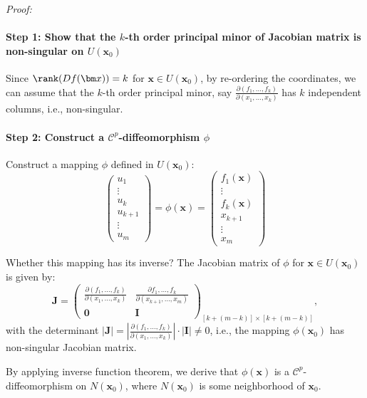\textit{Proof:}
\paragraph{Step 1: Show that the $k$-th order principal minor of Jacobian matrix is non-singular on $U(\bm x_0)$}
Since $\rank(Df(\bm x))=k$ for $\bm x\in U(\bm x_0)$, by re-ordering the coordinates, we can assume that the $k$-th order principal minor, say $\frac{\partial (f_1,\dots,f_k)}{\partial (x_1,\dots,x_k)}$ has $k$ independent columns, i.e., non-singular.

\paragraph{Step 2: Construct a $\mathcal{C}^p$-diffeomorphism $\phi$}
Construct a mapping $\phi$ defined in $U(\bm x_0)$:
\begin{equation}\label{Eq:11:18}
\begin{pmatrix}
u_1\\\vdots\\u_k\\u_{k+1}\\\vdots\\u_m
\end{pmatrix}
=
\phi(\bm x)
=\begin{pmatrix}
f_1(\bm x)\\
\vdots\\
f_k(\bm x)\\
x_{k+1}\\
\vdots\\
x_m
\end{pmatrix}
\end{equation}

Whether this mapping has its inverse? The Jacobian matrix of $\phi$ for $\bm x\in U(\bm x_0)$ is given by:
\[
\bm J=\begin{pmatrix}
\frac{\partial (f_1,\dots,f_k)}{\partial(x_1,\dots,x_k)}&\frac{\partial {f_1,\dots,f_k}}{\partial (x_{k+1},\dots,x_m)}\\
\bm0&\bm I
\end{pmatrix}_{[k+(m-k)]\times [k+(m-k)]},
\]
with the determinant $|\bm J|=|\frac{\partial (f_1,\dots,f_k)}{\partial(x_1,\dots,x_k)}|\cdot|\bm I|\ne0$, i.e., the mapping $\phi(\bm x_0)$ has non-singular Jacobian matrix. 

By applying inverse function theorem, we derive that $\phi(\bm x)$ is a $\mathcal{C}^p$-diffeomorphism on $N(\bm x_0)$, where $N(\bm x_0)$ is some neighborhood of $\bm x_0$.

